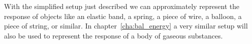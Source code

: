 \documentclass[a4paper,12pt,%
onecolumn,oneside,%
british%
]{memoir}
\renewcommand*{\|}[1][]{\nonscript\:#1\vert\nonscript\:\mathopen{}}
\newcommand*{\chap}{chapter}%
\begin{document}
%
%
With the simplified setup just described we can approximately represent the response of objects like an elastic band, a spring, a piece of wire, a balloon, a piece of string, or similar. In \chap~\ref{cha:bal_energy} a very similar setup will also be used to represent the response of a body of gaseous substances.
\end{document}

